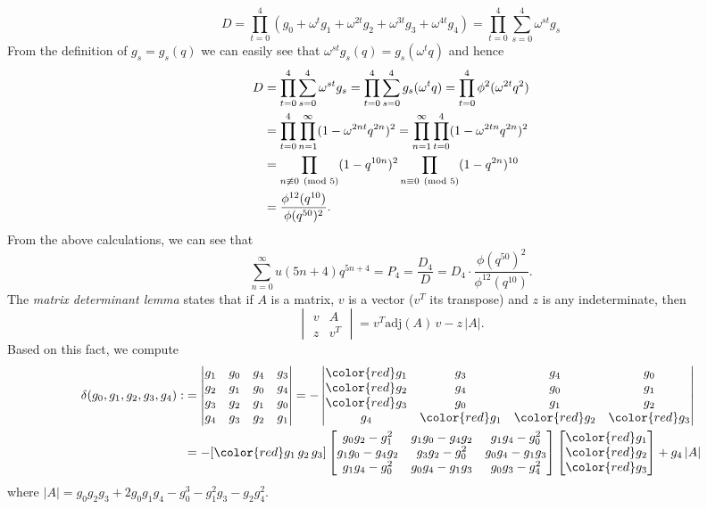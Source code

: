 \documentclass{article}
\begin{document}
$$D = \prod_{t = 0}^{4}(g_{0} + \omega^{t} g_{1} + \omega^{2t}g_{2} + \omega^{3t}g_{3} + \omega^{4t}g_{4})
= \prod_{t = 0}^{4}\sum_{s = 0}^{4}\omega^{st}g_{s}$$ 
From the definition of $g_{s} = g_{s}(q)$ we can easily see that $\omega^{st}g_{s}(q) = g_{s}(\omega^{t}q)$ and hence
\begin{align}
D &= \prod_{t = 0}^{4}\sum_{s = 0}^{4}\omega^{st}g_{s} = \prod_{t = 0}^{4}\sum_{s = 0}^{4}g_{s}(\omega^{t}q) 
= \prod_{t = 0}^{4}\phi^2(\omega^{2t}q^2)\notag\\
&= \prod_{t = 0}^{4}\prod_{n = 1}^{\infty}(1 - \omega^{2nt}q^{2n})^2 
= \prod_{n = 1}^{\infty}\prod_{t = 0}^{4}(1 - \omega^{2tn}q^{2n})^2 \notag\\
&= \prod_{n \not\equiv 0\pmod{5}}(1 - q^{10n})^2 \prod_{n \equiv 0\pmod{5}}(1 - q^{2n})^{10}  \notag \\
&= \frac{\phi^{12}(q^{10})}{\phi(q^{50})^2}.
\end{align}
From the above calculations, we can see that 
$$\sum_{n = 0}^{\infty}u(5n + 4)q^{5n + 4} = P_{4} = \frac{D_{4}}{D} = D_4\cdot \frac{\phi(q^{50})^2}{\phi^{12}(q^{10})}.$$ 
The \emph{matrix determinant lemma} \cite{Ding07} states that if $A$ is a matrix, $v$ is a vector ($v^T$ its transpose) and $z$ is any indeterminate, then
$$\begin{vmatrix} v & A  \\ z&  v^{T}  \end{vmatrix}= v^T\text{adj}(A)\, v - z\, \vert A\vert.$$
Based on this fact, we compute
\begin{align*}
\delta(g_0,g_1,g_2,g_3,g_4): &= \begin{vmatrix}
g_1&g_0&g_4&g_3 \\
g_2&g_1&g_0&g_4 \\
g_3&g_2&g_1&g_0 \\
g_4&g_3&g_2&g_1
\end{vmatrix}
= - \begin{vmatrix}
{\color{red}g_1}&g_3&g_4&g_0 \\
{\color{red}g_2}&g_4&g_0&g_1 \\
{\color{red}g_3}&g_0&g_1&g_2 \\
g_4&{\color{red}g_1}&{\color{red}g_2}&{\color{red}g_3}
\end{vmatrix}  \\
&=- [{\color{red}g_1\, g_2\, g_3}] 
\begin{bmatrix}
g_0g_2-g_1^2 & g_1g_0-g_4g_2 & g_1g_4-g_0^2 \\
g_1g_0-g_4g_2 & g_3g_2-g_0^2 & g_0g_4-g_1g_3 \\
g_1g_4-g_0^2 & g_0g_4-g_1g_3 & g_0g_3-g_4^2
\end{bmatrix} \begin{bmatrix} {\color{red} g_1}  \\  {\color{red} g_2}  \\ {\color{red}  g_3 }\end{bmatrix} 
+ g_4\, \vert A\vert
\end{align*}
where $\vert A\vert = g_0g_2g_3+ 2g_0g_1g_4 -g_0^3 -g_1^2g_3-g_2g_4^2$.
\end{document}
